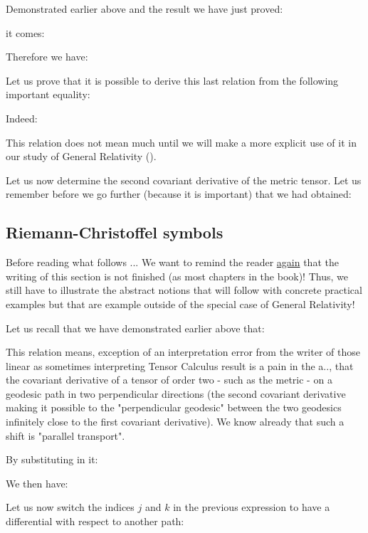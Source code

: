 	Demonstrated earlier above and the result we have just proved:
	
	it comes:
	
	Therefore we have:
	
	Let us prove that it is possible to derive this last relation from the following important equality:
	
	Indeed:
	
	This relation does not mean much until we will make a more explicit use of it in our study of General Relativity ().

	Let us now determine the second covariant derivative of the metric tensor. Let us remember before we go further (because it is important) that we had obtained:
	
	
	\subsection{Riemann-Christoffel symbols}\label{Riemann-Christoffel symbols}
	\begin{tcolorbox}[colback=red!5,borderline={1mm}{2mm}{red!5},arc=0mm,boxrule=0pt]
	\bcbombe Before reading what follows ... We want to remind the reader \underline{again} that the writing of this section is not finished (as most chapters in the book)! Thus, we still have to illustrate the abstract notions that will follow with concrete practical examples but that are example outside of the special case of General Relativity!
	\end{tcolorbox}
	
	Let us recall that we have demonstrated earlier above that:
	
	This relation means, exception of an interpretation error from the writer of those linear as sometimes interpreting Tensor Calculus result is a pain in the a.., that the covariant derivative of a tensor of order two - such as the metric - on a geodesic path in two perpendicular directions (the second covariant derivative making it possible to the "perpendicular geodesic" between the two geodesics infinitely close to the first covariant derivative). We know already that such a shift is "parallel transport".
	
	By substituting in it:
	
	We then have:
	
	Let us now switch the indices $j$ and $k$ in the previous expression to have a differential with respect to another path:
	
